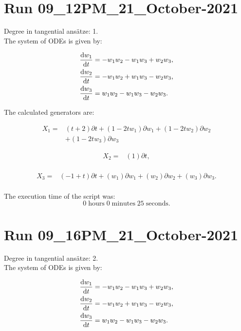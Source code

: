 \section*{Run 09\_12PM\_21\_October-2021}
Degree in tangential ansätze:	1.\\
The system of ODEs is given by:

\begin{align*}
\dv{w_{1}}{t}&=- w_{1} w_{2} - w_{1} w_{3} + w_{2} w_{3},\\
\dv{w_{2}}{t}&=- w_{1} w_{2} + w_{1} w_{3} - w_{2} w_{3},\\
\dv{w_{3}}{t}&=w_{1} w_{2} - w_{1} w_{3} - w_{2} w_{3}.\\
\end{align*}

\noindent The calculated generators are:

\begin{align*}
X_{1}=&\left(t+2 \right)\partial t+\left(1- 2 t w_{1} \right)\partial w_{1}+\left(1- 2 t w_{2} \right)\partial w_{2}\\
&+\left(1- 2 t w_{3} \right)\partial w_{3}
\end{align*}

\begin{align*}
X_{2}=&\left(1 \right)\partial t,\\
\end{align*}

\begin{align*}
X_{3}=&\left(-1+t \right)\partial t+\left(w_{1} \right)\partial w_{1}+\left(w_{2} \right)\partial w_{2}+\left(w_{3} \right)\partial w_{3}.\\
\end{align*}

\noindent The execution time of the script was:
$$0\;\mathrm{hours}\;0\;\mathrm{minutes}\;25 \;\mathrm{seconds}.$$
\section*{Run 09\_16PM\_21\_October-2021}
Degree in tangential ansätze:	2.\\
The system of ODEs is given by:

\begin{align*}
\dv{w_{1}}{t}&=- w_{1} w_{2} - w_{1} w_{3} + w_{2} w_{3},\\
\dv{w_{2}}{t}&=- w_{1} w_{2} + w_{1} w_{3} - w_{2} w_{3},\\
\dv{w_{3}}{t}&=w_{1} w_{2} - w_{1} w_{3} - w_{2} w_{3}.\\
\end{align*}

